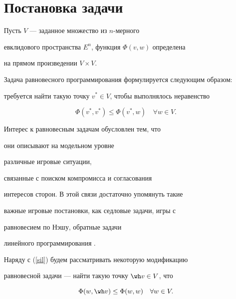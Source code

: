 \section{Постановка задачи}





Пусть $V$ --- заданное множество из $n$-мерного


евклидового пространства $E^n$, функция $\Phi(v,w)$ определена


на прямом произведении $V \times V$.





Задача равновесного программирования формулируется следующим образом:


требуется найти такую точку $v^*\in V$, чтобы выполнялось неравенство


\begin{equation}\label{sil}


\Phi(v^*,v^*) \leq \Phi(v^*,w)\quad\forall w\in V.


\end{equation}





Интерес к равновесным задачам обусловлен тем, что 


они описывают на модельном уровне


различные игровые ситуации,


связанные с поиском компромисса и согласования


интересов сторон. В этой связи достаточно упомянуть такие


важные игровые постановки, как седловые задачи, игры с 


равновесием по Нэшу, обратные задачи


линейного программирования \cite{antkak}.





Наряду с (\ref{sil}) будем рассматривать некоторую модификацию


равновесной задачи --- найти такую точку $\wh v\in V$, что


\begin{equation}\label{slab}


\Phi(w,\wh v) \leq \Phi(w,w)\quad\forall w\in V.


\end{equation}





